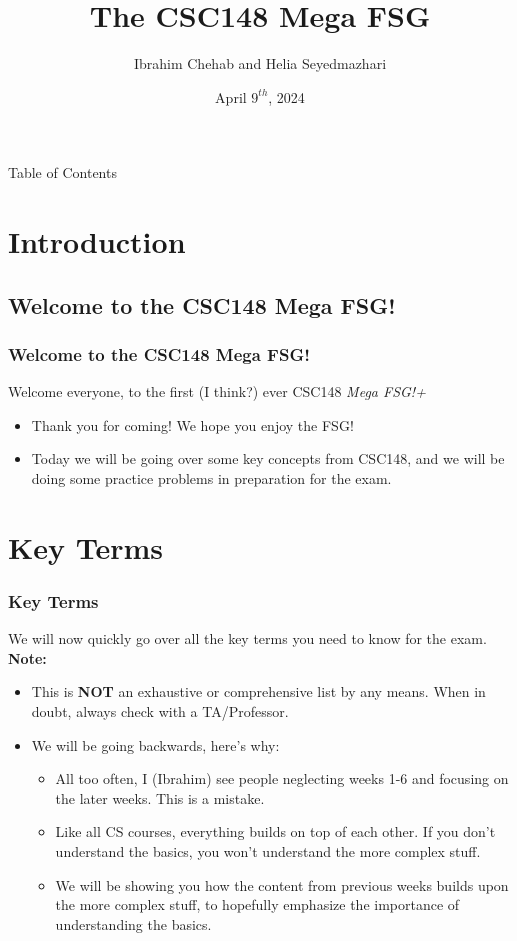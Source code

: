 \documentclass[hyperref={colorlinks,citecolor=blue,linkcolor=blue,urlcolor=blue}, aspectratio=1610]{beamer}
\title[CSC148 MEGA FSG]{The CSC148 Mega FSG}
\author[Ibrahim and Helia]{Ibrahim Chehab and Helia Seyedmazhari}
\institute{UTM RGASC}
\date{April $9^{th}$, 2024}
\begin{document}
\begin{frame}
  \titlepage
\end{frame}

\begin{frame}{Table of Contents}
  \tableofcontents
\end{frame}

\section{Introduction}
\subsection{Welcome to the CSC148 Mega FSG!}
\begin{frame}
    \frametitle{Welcome to the CSC148 Mega FSG!}
    Welcome everyone, to the first (I think?) ever CSC148 \textit{Mega FSG!+}
    \begin{itemize}
      \item Thank you for coming! We hope you enjoy the FSG!
      \item Today we will be going over some key concepts from CSC148, and we will be doing some practice problems in preparation for the exam.
    \end{itemize}
\end{frame}

\section{Key Terms}
\begin{frame}
  \frametitle{Key Terms}
  We will now quickly go over all the key terms you need to know for the exam.\\
  \textbf{Note:}
  \begin{itemize}
    \item This is \textbf{NOT} an exhaustive or comprehensive list by any means. When in doubt, always check with a TA/Professor.
    \item We will be going backwards, here's why:
    \begin{itemize}
      \item All too often, I (Ibrahim) see people neglecting weeks 1-6 and focusing on the later weeks. This is a mistake.
      \item Like all CS courses, everything builds on top of each other. If you don't understand the basics, you won't understand the more complex stuff.
      \item We will be showing you how the content from previous weeks builds upon the more complex stuff, to hopefully emphasize the importance of understanding the basics.
    \end{itemize}
  \end{itemize}
\end{frame}
\end{document}

